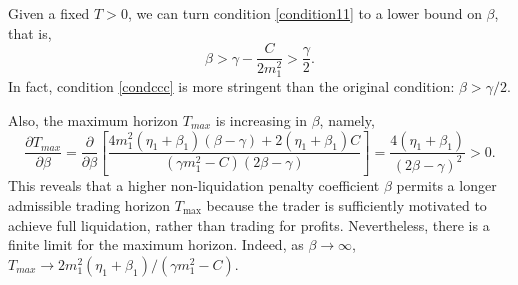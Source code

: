 \documentclass[12pt, letterpaper]{article}
\numberwithin{equation}{section}
\numberwithin{theorem}{section}
\begin{document}
Given a fixed $T>0$,  we can turn   condition \eqref{condition11} to a lower bound on $\beta$, that is,   \begin{equation}\label{condccc}
 \beta>\gamma-\frac{C}{2m_1^2}>\frac{\gamma}{2}.
  \end{equation}
In fact, condition \eqref{condccc} is    more stringent than the original condition:  $\beta>\gamma/2$. 



Also, the maximum horizon $T_{max}$ is increasing in $\beta$, namely, 
\begin{equation*}
\frac{\partial T_{max}}{\partial\beta}=\frac{\partial}{\partial\beta}\left[\frac{4m_1^2(\eta_1+\beta_1)(\beta-\gamma)+2(\eta_1+\beta_1)C}{(\gamma m_1^2-C)(2\beta-\gamma)}\right]=\frac{4(\eta_1+\beta_1)}{(2\beta-\gamma)^2}>0.
\end{equation*}
This reveals that a higher non-liquidation penalty coefficient $\beta$ permits a longer admissible trading horizon $T_{\max}$ because  the trader is sufficiently motivated to achieve full liquidation, rather than trading for profits.  Nevertheless, there is a finite limit for the maximum horizon. Indeed, as $\beta\rightarrow\infty$, $T_{max}\rightarrow {2m_1^2(\eta_1+\beta_1)}/{(\gamma m_1^2-C)}$.  


\end{document}
